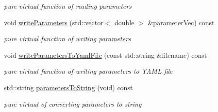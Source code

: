 \begin{DoxyCompactItemize}
\begin{DoxyCompactList}\small\item\em pure virtual function of reading parameters \end{DoxyCompactList}\item 
\mbox{\label{classcamodocal_1_1OCAMCamera_a2770ca0891c175e4e4ad1cdf1079be13}} 
void \hyperlink{classcamodocal_1_1OCAMCamera_a2770ca0891c175e4e4ad1cdf1079be13}{write\+Parameters} (std\+::vector$<$ double $>$ \&parameter\+Vec) const
\begin{DoxyCompactList}\small\item\em pure virtual function of writing parameters \end{DoxyCompactList}\item 
\mbox{\label{classcamodocal_1_1OCAMCamera_a97ae4b32f95c2a57d7adb0f72c19b957}} 
void \hyperlink{classcamodocal_1_1OCAMCamera_a97ae4b32f95c2a57d7adb0f72c19b957}{write\+Parameters\+To\+Yaml\+File} (const std\+::string \&filename) const
\begin{DoxyCompactList}\small\item\em pure virtual function of writing parameters to Y\+A\+ML file \end{DoxyCompactList}\item 
\mbox{\label{classcamodocal_1_1OCAMCamera_a8faee5f83c2fe617eddb439cd2da4dae}} 
std\+::string \hyperlink{classcamodocal_1_1OCAMCamera_a8faee5f83c2fe617eddb439cd2da4dae}{parameters\+To\+String} (void) const
\begin{DoxyCompactList}\small\item\em pure virtual of converting parameters to string \end{DoxyCompactList}\end{DoxyCompactItemize}

